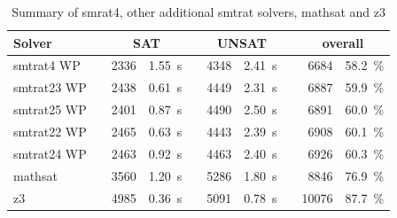 \begin{table}[!ht]
\caption{Summary of smrat4, other additional smtrat solvers, mathsat and z3}
\begin{tabularx}{\textwidth}{lXrrXrrXrr}
	\toprule
	\textbf{Solver}
	&& \multicolumn{2}{c}{\textbf{SAT}}
	&& \multicolumn{2}{c}{\textbf{UNSAT}}
	&& \multicolumn{2}{c}{\textbf{overall}}
	\\
	\midrule
	smtrat4 WP
	&& 2336 & 1.55~s
	&& 4348 & 2.41~s
	&& 6684 & 58.2~\%
	\\
	smtrat23 WP
	&& 2438 & 0.61~s
	&& 4449 & 2.31~s
	&& 6887 & 59.9~\%
	\\
	smtrat25 WP
	&& 2401 & 0.87~s
	&& 4490 & 2.50~s
	&& 6891 & 60.0~\%
	\\
	smtrat22 WP
	&& 2465 & 0.63~s
	&& 4443 & 2.39~s
	&& 6908 & 60.1~\%
	\\
	smtrat24 WP
	&& 2463 & 0.92~s
	&& 4463 & 2.40~s
	&& 6926 & 60.3~\%
	\\
	mathsat
    	&& 3560 & 1.20~s
     	&& 5286 & 1.80~s
     	&& 8846 & 76.9~\%
	\\
	z3
	&& 4985 & 0.36~s
	&& 5091 & 0.78~s
	&& 10076 & 87.7~\%
	\\
	\bottomrule
\end{tabularx}
\label{table:Summary_of_smrat4_and_other_additional_smtrat_solvers}
\end{table}

